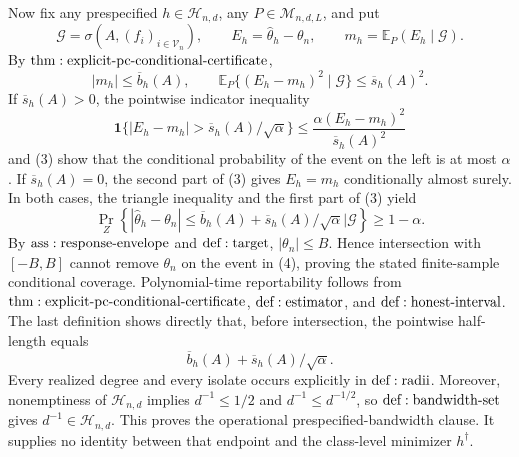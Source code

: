 Now fix any prespecified \(h\in\mathcal H_{n,d}\), any \(P\in\mathcal M_{n,d,L}\), and put
\[
 \mathcal G=\sigma\!\left(A,(f_i)_{i\in\mathcal V_n}\right),
 \qquad E_h=\widehat\theta_h-\theta_n,
 \qquad m_h=\mathbb E_P(E_h\mid\mathcal G).
\tag{2}
\]
By \({\rm thm:explicit\text{-}pc\text{-}conditional\text{-}certificate}\),
\[
 |m_h|\leq\overline b_h(A),
 \qquad
 \mathbb E_P\{(E_h-m_h)^2\mid\mathcal G\}
 \leq\overline s_h(A)^2.
\tag{3}
\]
If \(\overline s_h(A)>0\), the pointwise indicator inequality
\[
 \mathbf1\{|E_h-m_h|>\overline s_h(A)/\sqrt\alpha\}
 \leq\frac{\alpha(E_h-m_h)^2}{\overline s_h(A)^2}
\]
and (3) show that the conditional probability of the event on the left is at most \(\alpha\).  If \(\overline s_h(A)=0\), the second part of (3) gives \(E_h=m_h\) conditionally almost surely.  In both cases, the triangle inequality and the first part of (3) yield
\[
 \Pr_Z\!\left\{
 |\widehat\theta_h-\theta_n|
 \leq\overline b_h(A)+\overline s_h(A)/\sqrt\alpha
 \mathrel{\Big|}\mathcal G\right\}\geq1-\alpha.
\tag{4}
\]
By \({\rm ass:response\text{-}envelope}\) and \({\rm def:target}\), \(|\theta_n|\leq B\).  Hence intersection with \([-B,B]\) cannot remove \(\theta_n\) on the event in (4), proving the stated finite-sample conditional coverage.  Polynomial-time reportability follows from \({\rm thm:explicit\text{-}pc\text{-}conditional\text{-}certificate}\), \({\rm def:estimator}\), and \({\rm def:honest\text{-}interval}\).  The last definition shows directly that, before intersection, the pointwise half-length equals
\[
 \overline b_h(A)+\overline s_h(A)/\sqrt\alpha.
\tag{5}
\]
Every realized degree and every isolate occurs explicitly in \({\rm def:radii}\).  Moreover, nonemptiness of \(\mathcal H_{n,d}\) implies \(d^{-1}\leq1/2\) and \(d^{-1}\leq d^{-1/2}\), so \({\rm def:bandwidth\text{-}set}\) gives \(d^{-1}\in\mathcal H_{n,d}\).  This proves the operational prespecified-bandwidth clause.  It supplies no identity between that endpoint and the class-level minimizer \(h^\dagger\).

